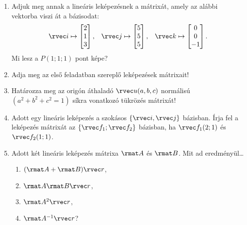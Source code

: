 \documentclass[a4paper, 12pt]{scrartcl}
\begin{document}
\begin{enumerate}
  \item Adjuk meg annak a lineáris leképezésnek a mátrixát, amely az alábbi
        vektorba viszi át a bázisodat:
        $$
          \rvec i \mapsto \begin{bmatrix}
            2 \\ 1 \\ 3
          \end{bmatrix}
          \text, \quad
          \rvec j \mapsto \begin{bmatrix}
            5 \\ 5 \\ 5
          \end{bmatrix}
          \text, \quad
          \rvec k \mapsto \begin{bmatrix}
            0 \\ 0 \\ -1
          \end{bmatrix}
          \text.
        $$
        Mi lesz a $P(1; 1; 1)$ pont képe?

  \item Adja meg az első feladatban szereplő leképezések mátrixait!

  \item Határozza meg az origón áthaladó $\rvec u (a,b,c)$ normálisú
        $(a^2+b^2+c^2 = 1)$ síkra vonatkozó tükrözés mátrixát!

  \item Adott egy lineáris leképezés a szokásos $\{ \rvec i, \rvec j \}$
        bázisban. Írja fel a leképezés mátrixát az $\{ \rvec f_1; \rvec f_2 \}$
        bázisban, ha $\rvec f_1(2; 1)$ és $\rvec f_2(1; 1)$.

  \item Adott két lineáris leképezés mátrixa $\rmat A$ és $\rmat B$.
        Mit ad eredményül\dots
        \begin{multicols}{4}
          \begin{enumerate}
            \item $(\rmat A + \rmat B) \rvec r$,
            \item $\rmat A \rmat B \rvec r$,
            \item $\rmat A^2 \rvec r$,
            \item $\rmat A^{-1} \rvec r$?
          \end{enumerate}
        \end{multicols}


\end{enumerate}
\end{document}
